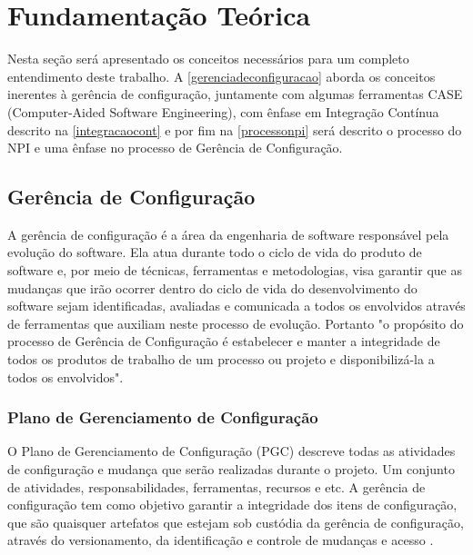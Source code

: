 \chapter{Fundamentação Teórica}\label{fundamentacao}
Nesta seção será apresentado os conceitos necessários para um completo entendimento deste trabalho. A \autoref{gerenciadeconfiguracao} aborda os conceitos inerentes à gerência de configuração, juntamente com algumas ferramentas CASE (Computer-Aided Software Engineering), com ênfase em Integração Contínua descrito na \autoref{integracaocont} e por fim na \autoref{processonpi} será descrito o processo do NPI e uma ênfase no processo de Gerência de Configuração.

\section{Gerência de Configuração}\label{gerenciadeconfiguracao}
A gerência de configuração é a área da engenharia de software responsável pela evolução do software. Ela atua durante todo o ciclo de vida do produto de software e, por meio de técnicas, ferramentas e metodologias, visa garantir que as mudanças que irão ocorrer dentro do ciclo de vida do desenvolvimento do software sejam identificadas, avaliadas e comunicada a todos os envolvidos através de ferramentas que auxiliam neste processo de evolução.
Portanto "o propósito do processo de Gerência de Configuração é estabelecer e manter a integridade de todos os produtos de trabalho de um processo ou projeto e disponibilizá-la a todos os envolvidos"\space\cite{mpsbr}.
\subsection{Plano de Gerenciamento de Configuração}\label{pgc}
O Plano de Gerenciamento de Configuração (PGC) descreve todas as atividades de configuração e mudança que serão realizadas durante o projeto. Um conjunto de atividades, responsabilidades, ferramentas, recursos e etc. A gerência de configuração tem como objetivo garantir a integridade dos itens de configuração, que são quaisquer artefatos que estejam sob custódia da gerência de configuração, através do versionamento, da identificação e controle de mudanças e acesso \cite{pressman2010}. 

